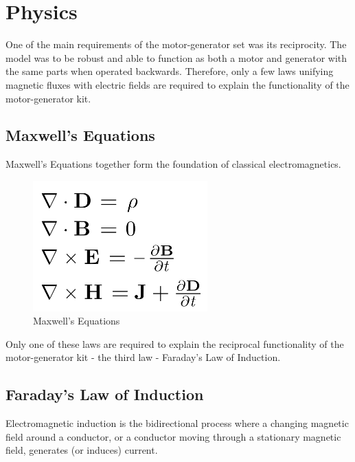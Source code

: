 \section{Physics}
One of the main requirements of the motor-generator set was its reciprocity. The model was to be robust and able to function as both a motor and generator with the same parts when operated backwards. Therefore, only a few laws unifying magnetic fluxes with electric fields are required to explain the functionality of the motor-generator kit.

    \subsection{Maxwell's Equations}
    Maxwell's Equations together form the foundation of classical electromagnetics.\\

        \begin{figure}[ht]
            \begin{center}
                \includegraphics[width=0.6\textwidth]{figures/maxwell.png}
                \caption{Maxwell's Equations} \label{fig:maxwell}
            \end{center}
        \end{figure}

    \noindent
    Only one of these laws are required to explain the reciprocal functionality of the motor-generator kit - the third law - Faraday's Law of Induction.

    \subsection{Faraday's Law of Induction}
    Electromagnetic induction is the bidirectional process where a changing magnetic field around a conductor, or a conductor moving through a stationary magnetic field, generates (or induces) current.

